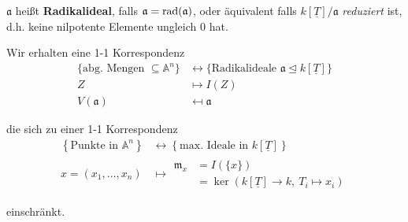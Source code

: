 $\mathfrak{a}$ heißt \textbf{Radikalideal},
falls $\mathfrak{a}=\operatorname{rad}(\mathfrak{a})$, oder äquivalent falls $k[\underline{T}]/\mathfrak{a}$
\emph{reduziert} ist, d.h. keine nilpotente Elemente ungleich $0$ hat.
\begin{cor}
  \label{korrespondenz-radikalideal-abgeschlossene-mengen}
  Wir erhalten eine 1-1 Korrespondenz
  \begin{align*}
    \{\text{abg. Mengen }\subseteq\mathbb{A}^{n}\} & \leftrightarrow\{\text{Radikalideale }\mathfrak{a}\unlhd k[\underline{T}]\}\\
    Z & \mapsto I(Z)\\
    V(\mathfrak{a}) & \mapsfrom\mathfrak{a}
  \end{align*}

  die sich zu einer 1-1 Korrespondenz
  \begin{align*}
    \left\{ \text{Punkte in }\mathbb{A}^{n}\right\}
    & \leftrightarrow\left\{ \text{max. Ideale in }k[\underline{T}]\right\} \\
    x=(x_{1},\ldots,x_{n})
    & \mapsto
      \begin{array}{rl}
        \mathfrak{m}_{x} & =I(\{x\})\\
                         & =\ker(k[\underline{T}]\rightarrow k,\ T_{i}\mapsto x_{i})
      \end{array}
  \end{align*}

  einschränkt.
\end{cor}
